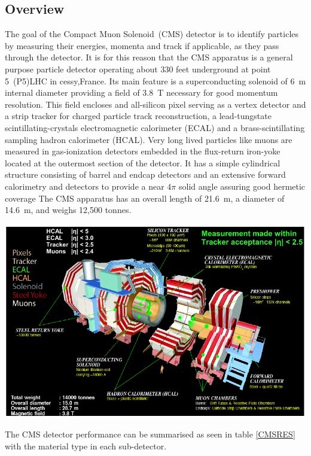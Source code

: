 \subsection{Overview}
The goal of the  Compact Muon Solenoid~(CMS) detector is to identify particles by measuring their energies, momenta and track if applicable, as they pass through the detector. It is for this reason that the CMS apparatus is a general purpose particle detector operating about 330 feet underground at  point 5~(P5)LHC in cessy,France. Its main feature is a superconducting solenoid of 6~m internal diameter providing a field of 3.8~T necessary for good momentum resolution. 
This field  encloses and all-silicon pixel serving as a vertex detector and a strip tracker for charged particle track reconstruction, a lead-tungstate scintillating-crystals electromagnetic calorimeter (ECAL) and a brass-scintillating sampling hadron calorimeter (HCAL). Very long lived particles like muons are measured in gas-ionization detectors embedded in the flux-return iron-yoke located at the outermost section of the detector.
It has a simple cylindrical structure consisting of barrel and endcap detectors and an extensive forward calorimetry and detectors to provide a near $4\pi$ solid angle assuring good hermetic coverage
The CMS apparatus has an overall length of 21.6~m, a diameter of 14.6~m, and weighs 12,500 tonnes. 
\begin{center}
\centering
\mbox{\includegraphics[scale=0.6]{THESISPLOTS/CMS-Detector.png}} 
\label{fig:CMS-DET}
\end{center}
The CMS detector performance can be summarised as seen in table \eqref{CMSRES} with the material type in each sub-detector.

